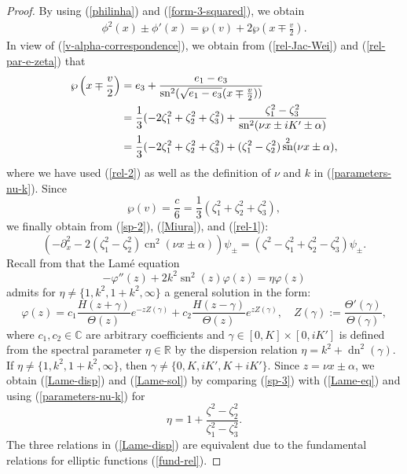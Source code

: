 \documentclass[12pt,reqno]{amsart}
\numberwithin{equation}{section}
\DeclareMathOperator{\sn}{sn}
\DeclareMathOperator{\cn}{cn}
\DeclareMathOperator{\dn}{dn}
\begin{document}
\begin{proof}
By using (\ref{philinha}) and (\ref{form-3-squared}), we obtain 
\begin{align}
\label{Miura}
\phi^2(x) \pm \phi'(x) = \wp(v) + 2 \wp\left(x \mp \frac{v}{2} \right).
\end{align}
In view of (\ref{v-alpha-correspondence}), we obtain from (\ref{rel-Jac-Wei}) and (\ref{rel-par-e-zeta}) that 
\begin{align}
\wp\left(x \mp \frac{v}{2} \right) &= e_3 + \frac{e_1-e_3}{\sn^2(\sqrt{e_1-e_3}(x \mp \frac{v}{2}))} \notag \\
&= \frac{1}{3} (-2\zeta_1^2 + \zeta_2^2 + \zeta_3^2) + \frac{\zeta_1^2 - \zeta_3^2}{\sn^2(\nu x \pm i K' \pm \alpha)} \notag \\
&= \frac{1}{3} (-2\zeta_1^2 + \zeta_2^2 + \zeta_3^2) + (\zeta_1^2 - \zeta_2^2) \sn^2(\nu x \pm \alpha), \label{rel-1}
\end{align}
where we have used (\ref{rel-2}) as well as the definition of $\nu$ and $k$ in (\ref{parameters-nu-k}). Since 
\begin{equation}
\label{rel-3}
\wp(v) = \frac{c}{6} = \frac{1}{3} (\zeta_1^2 + \zeta_2^2 + \zeta_3^2),
\end{equation}
we finally obtain from (\ref{sp-2}), (\ref{Miura}), and (\ref{rel-1}):
\begin{equation}
\label{sp-3} 
\left( - \partial_x^2 -2 (\zeta_1^2-\zeta_2^2) \cn^2(\nu x \pm \alpha)  \right) \psi_{\pm} = (\zeta^2 - \zeta_1^2 + \zeta_2^2 - \zeta_3^2) \psi_{\pm}.
\end{equation}
Recall from \cite[p.395]{Ince} that the Lam\'{e} equation 
\begin{equation}
\label{Lame-eq}
-\varphi''(z) + 2 k^2 \sn^2(z) \varphi(z) = \eta \varphi(z) 
\end{equation}
admits for $\eta \neq \{ 1,k^2,1+k^2,\infty \}$ a general solution in the form: 
\begin{equation*}
\varphi(z) = c_1 \frac{H(z + \gamma)}{\Theta(z)} e^{-z Z(\gamma)} + 
c_2 \frac{H(z-\gamma)}{\Theta(z)} e^{z Z(\gamma)}, \quad Z(\gamma) := \frac{\Theta'(\gamma)}{\Theta(\gamma)}, 
\end{equation*}
where $c_1,c_2 \in \mathbb{C}$ are arbitrary coefficients and 
$\gamma \in [0,K] \times [0,iK']$ is defined from the spectral parameter $\eta \in \mathbb{R}$ by the dispersion relation $\eta = k^2 + \dn^2(\gamma)$. 
If $\eta \neq \{ 1,k^2,1+k^2,\infty \}$, then $\gamma \neq \{ 0, K, iK', K+iK'\}$.
Since $z = \nu x \pm \alpha$,  we obtain (\ref{Lame-disp}) and (\ref{Lame-sol}) by comparing (\ref{sp-3}) with (\ref{Lame-eq}) and using (\ref{parameters-nu-k}) for $$
\eta = 1 + \frac{\zeta^2 - \zeta_2^2}{\zeta_1^2 - \zeta_3^2}.
$$ 
The three relations in (\ref{Lame-disp}) are equivalent due to 
the fundamental relations for elliptic functions (\ref{fund-rel}).
\end{proof}
\end{document}
